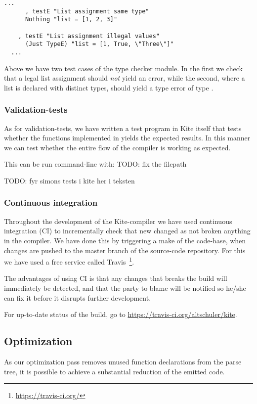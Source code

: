 \begin{lstlisting}[caption=\code{Kite.Test.TypeCheck.hs} snippet]
  ...
      , testE "List assignment same type"
      Nothing "list = [1, 2, 3]"

    , testE "List assignment illegal values"
      (Just TypeE) "list = [1, True, \"Three\"]"
  ...
\end{lstlisting}

Above we have two test cases of the type checker module. In the first
we check that a legal list assignment should \emph{not} yield an
error, while the second, where a list is declared with distinct types,
should yield a type error of type .

\subsubsection{Validation-tests}

As for validation-tests, we have written a test program in Kite itself that tests whether the functions implemented in  yields the expected results. In this manner we can test whether the entire flow of the compiler is working as expected.

This can be run command-line with:  TODO: fix the filepath


TODO: fyr simons tests i kite her i teksten


\subsubsection{Continuous integration}
Throughout the development of the Kite-compiler we have used
continuous integration (CI) to incrementally check that new changed as
not broken anything in the compiler. We have done this by triggering a
make of the code-base, when changes are pushed to the master branch of
the source-code repository. For this we have used a free service
called Travis~\footnote{\url{https://travis-ci.org/}}.

The advantages of using CI is that any changes that breaks the build
will immediately be detected, and that the party to blame will be
notified so he/she can fix it before it disrupts further development.

For up-to-date status of the build, go to \url{https://travis-ci.org/altschuler/kite}.


\subsection{Optimization}
As our optimization pass removes unused function declarations from the parse tree, it is possible to achieve a substantial reduction of the emitted code.

